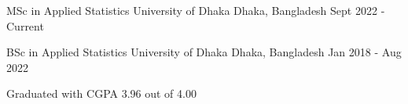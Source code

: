 

\begin{cventries}

  \cventry
    {MSc in Applied Statistics} %
    {University of Dhaka} %
    {Dhaka, Bangladesh} %
    {Sept 2022 - Current} %
    {
      \begin{cvitems} %
      \end{cvitems}
    }
    
  \cventry
    {BSc in Applied Statistics} %
    {University of Dhaka} %
    {Dhaka, Bangladesh} %
    {Jan 2018 - Aug 2022} %
    {
      \begin{cvitems} %
        \item {Graduated with CGPA 3.96 out of 4.00}
      \end{cvitems}
    }
    
\end{cventries}
